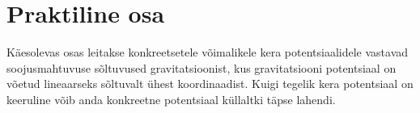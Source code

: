 \documentclass{trkut}%
\begin{document}

\chapter{Praktiline osa}

Käesolevas osas leitakse konkreetsetele võimalikele kera potentsiaalidele vastavad soojusmahtuvuse sõltuvused gravitatsioonist, kus gravitatsiooni potentsiaal on võetud lineaarseks sõltuvalt ühest koordinaadist.
Kuigi tegelik kera potentsiaal on keeruline võib anda konkreetne potentsiaal küllaltki täpse lahendi.
\end{document}
